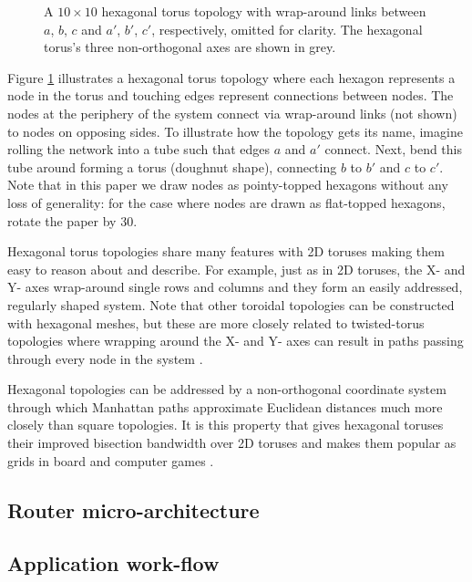 			\begin{figure}
				\center
				
				
				\caption{A $10 \times 10$ hexagonal torus topology with wrap-around
				links between $a$, $b$, $c$ and $a'$, $b'$, $c'$, respectively, omitted
				for clarity. The hexagonal torus's three non-orthogonal axes are shown
				in grey.}
				\label{fig:hexagonalTorusTopology}
			\end{figure}
			
			Figure \ref{fig:hexagonalTorusTopology} illustrates a hexagonal torus
			topology where each hexagon represents a node in the torus and touching
			edges represent connections between nodes. The nodes at the periphery of
			the system connect via wrap-around links (not shown) to nodes on opposing
			sides. To illustrate how the topology gets its name, imagine rolling the
			network into a tube such that edges $a$ and $a'$ connect. Next, bend this
			tube around forming a torus (doughnut shape), connecting $b$ to $b'$ and
			$c$ to $c'$. Note that in this paper we draw nodes as pointy-topped
			hexagons without any loss of generality: for the case where nodes are
			drawn as flat-topped hexagons, rotate the paper by 30\degree{}.
			
			Hexagonal torus topologies share many features with 2D toruses making them
			easy to reason about and describe. For example, just as in 2D toruses, the
			X- and Y- axes wrap-around single rows and columns and they form an easily
			addressed, regularly shaped system. Note that other toroidal topologies
			can be constructed with hexagonal meshes, but these are more closely
			related to twisted-torus topologies where wrapping around the X- and Y-
			axes can result in paths passing through every node in the system
			\cite{camara10}.
			
			Hexagonal topologies can be addressed by a non-orthogonal coordinate
			system through which Manhattan paths approximate Euclidean distances much
			more closely than square topologies. It is this property that gives
			hexagonal toruses their improved bisection bandwidth over 2D toruses and
			makes them popular as grids in board and computer games \cite{patel15}.
		
		\subsection{Router micro-architecture}
		\subsection{Application work-flow}
